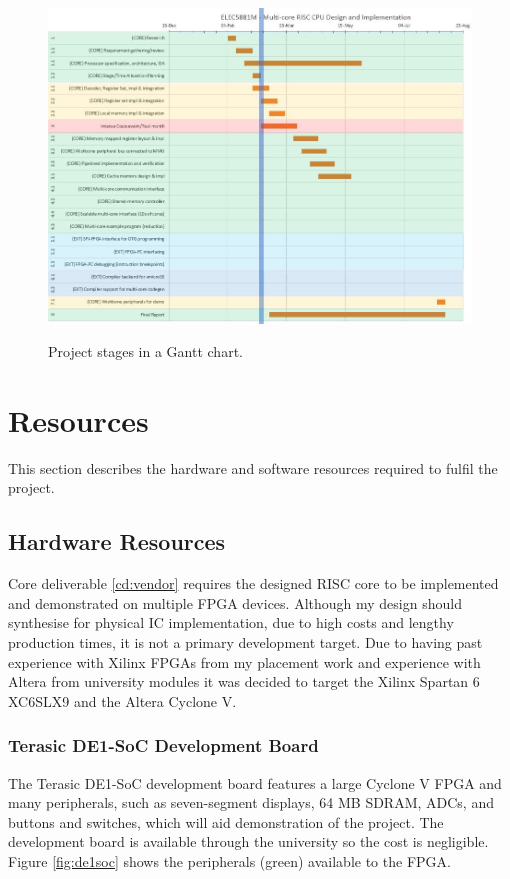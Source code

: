 \documentclass[11pt,a4paper]{report}
\begin{document}
{\begin{figure}[h]
\centering
\includegraphics[width=13cm]{../img/week1_gantt}
\label{fig:arduino_record}
\caption{Project stages in a Gantt chart.}
\end{figure}


\section{Resources}
This section describes the hardware and software resources required to fulfil the project. 

\subsection{Hardware Resources}
Core deliverable \ref{cd:vendor} requires the designed RISC core to be implemented and demonstrated on multiple FPGA devices.  Although my design should synthesise for physical IC implementation, due to high costs and lengthy production times, it is not a primary development target. 
Due to having past experience with Xilinx FPGAs from my placement work and experience with Altera from university modules it was decided to target the Xilinx Spartan 6 XC6SLX9 and the Altera Cyclone V.

\subsubsection{Terasic DE1-SoC Development Board}
The Terasic DE1-SoC development board features a large Cyclone V FPGA and many peripherals, such as seven-segment displays, 64 MB SDRAM, ADCs, and buttons and switches, which will aid demonstration of the project. The development board is available through the university so the cost is negligible. Figure \ref{fig:de1soc} shows the peripherals (green) available to the FPGA.

}
\end{document}
